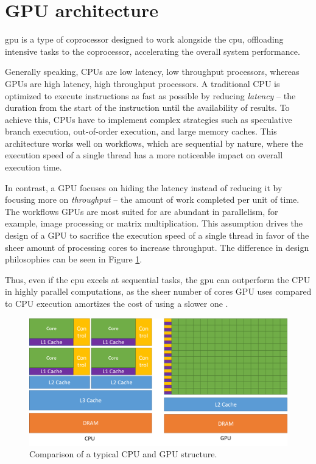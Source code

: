 \section {GPU architecture}

\acrfull{gpu} is a type of coprocessor designed to work alongside the \acrshort{cpu}, offloading intensive tasks to the coprocessor, accelerating the overall system performance.

Generally speaking, CPUs are low latency, low throughput processors, whereas GPUs are high latency, high throughput processors. A traditional CPU is optimized to execute instructions as fast as possible by reducing \textit{latency} -- the duration from the start of the instruction until the availability of results. To achieve this, CPUs have to implement complex strategies such as speculative branch execution, out-of-order execution, and large memory caches. This architecture works well on workflows, which are sequential by nature, where the execution speed of a single thread has a more noticeable impact on overall execution time.

In contrast, a GPU focuses on hiding the latency instead of reducing it by focusing more on \textit{throughput} -- the amount of work completed per unit of time. The workflows GPUs are most suited for are abundant in parallelism, for example, image processing or matrix multiplication. This assumption drives the design of a GPU to sacrifice the execution speed of a single thread in favor of the sheer amount of processing cores to increase throughput. The difference in design philosophies can be seen in Figure \ref{figure:cpu-vs-gpu}.

Thus, even if the \acrshort{cpu} excels at sequential tasks, the \acrshort{gpu} can outperform the CPU in highly parallel computations, as the sheer number of cores GPU uses compared to CPU execution amortizes the cost of using a slower one \cite{cudaprog}.

\begin{figure}
  \centering
  \includegraphics[width=\textwidth]{components/figure/cpu-vs-gpu.png}
  \caption{Comparison of a typical CPU and GPU structure. \cite{cudaprog}}
  \label{figure:cpu-vs-gpu}
\end{figure}

